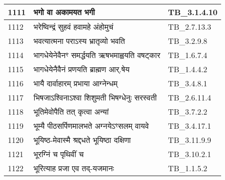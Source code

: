 \documentclass[17pt]{extarticle}
\begin{document}
\begin{longtable}{||p{0.4in}||p{4.9in}||p{0.9in}||}
    \hline
        
    1111 & भगो वा अकामयत भगी & TB\_3.1.4.10       \\
    
    \hline
        
    1112 & भरेष्विन्द्रं सुहवं हवामहे अंहोमुचं & TB\_2.7.13.3       \\
    
    \hline
        
    1113 & भवत्यात्मना पराऽस्य भ्रातृव्यो भवति & TB\_3.2.9.8       \\
    
    \hline
        
    1114 & भागधेयेनेवैनꣳ समर्द्धयति ऋषभमाह्वयति वषट्कार & TB\_1.6.7.4       \\
    
    \hline
        
    1115 & भागधेयेनैवैनं प्रणयति ब्राह्मण आर्.षेय & TB\_1.4.4.2       \\
    
    \hline
        
    1116 & भायै दार्वाहारम् प्रभाया आग्नेन्धम् & TB\_3.4.8.1       \\
    
    \hline
        
    1117 & भिषजाऽश्विनाऽश्वा शिशुमती भिषग्धेनुः सरस्वती & TB\_2.6.11.4       \\
    
    \hline
        
    1118 & भूतिमेवोपैति तत् कृत्वा अन्यां & TB\_3.7.2.2       \\
    
    \hline
        
    1119 & भूम्यै पीठसर्पिणमालभते अग्नयेऽꣳसलम् वायवे & TB\_3.4.17.1       \\
    
    \hline
        
    1120 & भूयिष्ठ{-}मेवास्मै श्रद्दधते भूयिष्ठा दक्षिणा & TB\_3.11.9.9       \\
    
    \hline
        
    1121 & भूरग्निं च पृथिवीं च & TB\_3.10.2.1       \\
    
    \hline
        
    1122 & भूरित्याह प्रजा एव तद्{-}यजमानः & TB\_1.1.5.2       \\
    
    \hline
        

\end{longtable}
\end{document}
